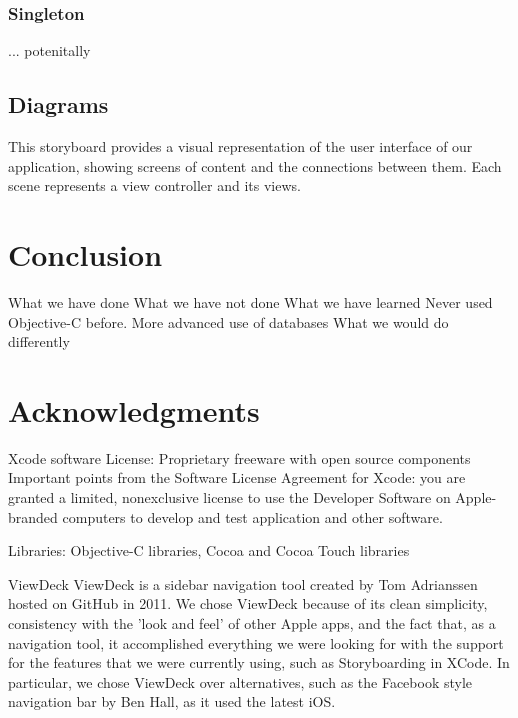 \documentclass[a4wide, 10pt]{article}
\begin{document}
\subsubsection{Singleton}
... potenitally

\subsection{Diagrams}
This storyboard provides  a visual representation of the user interface of our application, showing screens of content and the connections between them. Each scene represents a view controller and its views. 

\section{Conclusion}
	What we have done
	What we have not done
	What we have learned
		Never used Objective-C before.
		More advanced use of databases
	What we would do differently
	
\section{Acknowledgments}

Xcode software
License: Proprietary freeware with open source components
Important points from the Software License Agreement for Xcode:
you are granted a limited, nonexclusive license to use the Developer Software on Apple-branded computers to develop and test application and other software.

Libraries: Objective-C libraries, Cocoa and Cocoa Touch libraries

ViewDeck
ViewDeck is a sidebar navigation tool created by Tom Adrianssen hosted on GitHub in 2011. We chose ViewDeck because of its clean simplicity, consistency with the 'look and feel' of other Apple apps, and the fact that, as a navigation tool, it accomplished everything we were looking for with the support for the features that we were currently using, such as Storyboarding in XCode. In particular, we chose ViewDeck over alternatives, such as the Facebook style navigation bar by Ben Hall, as it used the latest iOS.
\end{document}
